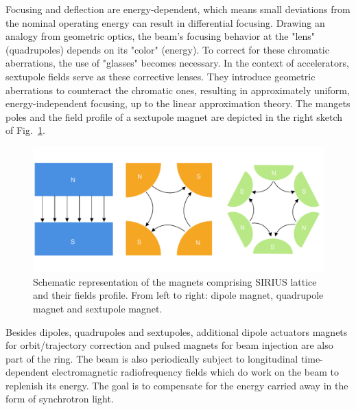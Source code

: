 Focusing and deflection are energy-dependent, which means small deviations from the nominal operating energy can result in differential focusing. Drawing an analogy from geometric optics, the beam's focusing behavior at the "lens" (quadrupoles) depends on its "color" (energy). To correct for these chromatic aberrations, the use of "glasses" becomes necessary. In the context of accelerators, sextupole fields serve as these corrective lenses. They introduce geometric aberrations to counteract the chromatic ones, resulting in approximately uniform, energy-independent focusing, up to the linear approximation theory. The mangets poles and the field profile of a sextupole magnet are depicted in the right sketch of Fig.~\ref{fig:magnets_fields}.
\begin{figure}[htb]
    \includegraphics[width=\textwidth]{Images/magnets.pdf}
    \caption{Schematic representation of the magnets comprising SIRIUS lattice and their fields profile. From left to right: dipole magnet, quadrupole magnet and sextupole magnet.}
    \label{fig:magnets_fields}
\end{figure}

Besides dipoles, quadrupoles and sextupoles, additional dipole actuators magnets for orbit/trajectory correction and pulsed magnets for beam injection are also part of the ring. The beam is also periodically subject to longitudinal time-dependent electromagnetic radiofrequency fields which do work on the beam to replenish its energy. The goal is to compensate for the energy carried away in the form of synchrotron light.


